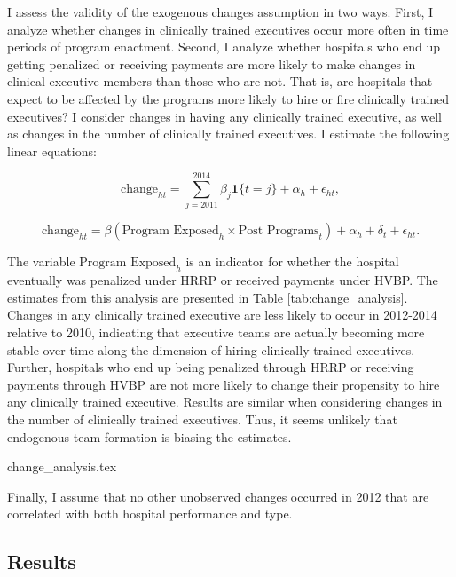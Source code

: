 \documentclass[12pt]{article}
\begin{document}
     I assess the validity of the exogenous changes assumption in two ways. First, I analyze whether changes in clinically trained executives occur more often in time periods of program enactment. Second, I analyze whether hospitals who end up getting penalized or receiving payments are more likely to make changes in clinical executive members than those who are not. That is, are hospitals that expect to be affected by the programs more likely to hire or fire clinically trained executives? I consider changes in having any clinically trained executive, as well as changes in the number of clinically trained executives. I estimate the following linear equations:

    \begin{equation}\label{eq:change1}
    \text{change}_{ht} = \sum_{j=2011}^{2014}\beta_j\mathbf{1}\{t=j\} + \alpha_h + \epsilon_{ht},
    \end{equation}

    \begin{equation}\label{eq:change2}
    \text{change}_{ht} = \beta(\text{Program Exposed}_{h} \times \text{Post Programs}_t)+ \alpha_h + \delta_t + \epsilon_{ht}.
    \end{equation}

    The variable $\text{Program Exposed}_{h}$ is an indicator for whether the hospital eventually was penalized under HRRP or received payments under HVBP. The estimates from this analysis are presented in Table \ref{tab:change_analysis}. Changes in any clinically trained executive are less likely to occur in 2012-2014 relative to 2010, indicating that executive teams are actually becoming more stable over time along the dimension of hiring clinically trained executives. Further, hospitals who end up being penalized through HRRP or receiving payments through HVBP are not more likely to change their propensity to hire any clinically trained executive. Results are similar when considering changes in the number of clinically trained executives. Thus, it seems unlikely that endogenous team formation is biasing the estimates.

     {change_analysis.tex}

    Finally, I assume that no other unobserved changes occurred in 2012 that are correlated with both hospital performance and type. 

    
    
    \subsection{Results}
\end{document}
